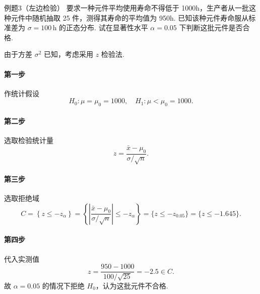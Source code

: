 \begin{question}{例题3（左边检验）}
    要求一种元件平均使用寿命不得低于 1000h，生产者从一批这种元件中随机抽取 25 件，测得其寿命的平均值为 950h. 已知该种元件寿命服从标准差为 $\sigma = 100 \,\mathrm{h}$ 的正态分布. 试在显著性水平 $\alpha=0.05$ 下判断这批元件是否合格.
\end{question}
\begin{solution}
    由于方差 $\sigma^2$ 已知，考虑采用 $z$ 检验法.
    \paragraph{第一步} 作统计假设
    $$
        H_0: \mu=\mu_0=1000, \quad H_1: \mu<\mu_0=1000.
    $$
    \paragraph{第二步} 选取检验统计量
    $$
        z = \frac{\bar{x}-\mu_0}{\sigma/\sqrt{n}} .
    $$
    \paragraph{第三步} 选取拒绝域
    $$
        C = \left\{z \leqslant -z_{\alpha}\right\}
        = \left\{\left|\frac{\bar{x}-\mu_0}{\sigma/\sqrt{n}}\right| \leqslant -z_{\alpha}\right\}
        = \{z \leqslant -z_{0.05}\}
        = \{z \leqslant -1.645\}.
    $$
    \paragraph{第四步} 代入实测值
    $$
        z = \frac{950-1000}{100/\sqrt{25}} = -2.5 \in C.
    $$
    故 $\alpha = 0.05$ 的情况下拒绝 $H_0$，认为这批元件不合格.
\end{solution}



